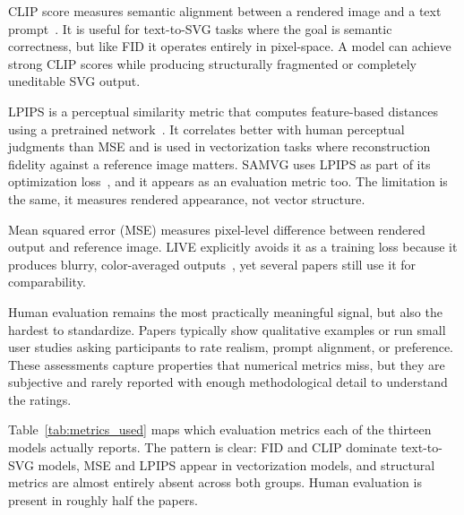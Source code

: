 CLIP score measures semantic alignment between a rendered 
image and a text 
prompt~\cite{radfordLearningTransferableVisual2021}. It is useful for 
text-to-SVG tasks where the goal is semantic correctness, 
but like FID it operates entirely in pixel-space. A model 
can achieve strong CLIP scores while producing structurally 
fragmented or completely uneditable SVG output.

LPIPS is a perceptual similarity metric that 
computes feature-based distances using a pretrained 
network~\cite{zhangUnreasonableEffectivenessDeep2018}. 
It correlates better with human perceptual judgments than 
MSE and is used in vectorization tasks where reconstruction 
fidelity against a reference image matters. SAMVG uses LPIPS 
as part of its optimization 
loss~\cite{zhuSAMVGMultistageImage2023}, and it appears as 
an evaluation metric too. The 
limitation is the same, it measures rendered appearance, 
not vector structure.

Mean squared error (MSE) measures pixel-level difference between
rendered output and reference image. LIVE explicitly avoids it as 
a training loss because it produces blurry, color-averaged 
outputs~\cite{maLayerwiseImageVectorization2022}, yet several
papers still use it for comparability.

Human evaluation remains the most practically 
meaningful signal, but also the hardest to standardize. 
Papers typically show qualitative examples or run 
small user studies asking participants to rate realism, 
prompt alignment, or preference. These assessments capture 
properties that numerical metrics miss, but they are 
subjective and rarely reported 
with enough methodological detail to understand the ratings.

Table~\ref{tab:metrics_used} maps which evaluation metrics
each of the thirteen models actually reports. The 
pattern is clear: FID and CLIP dominate text-to-SVG models, 
MSE and LPIPS appear in vectorization models, and structural 
metrics are almost entirely absent across both groups. 
Human evaluation is present in roughly half the papers.


